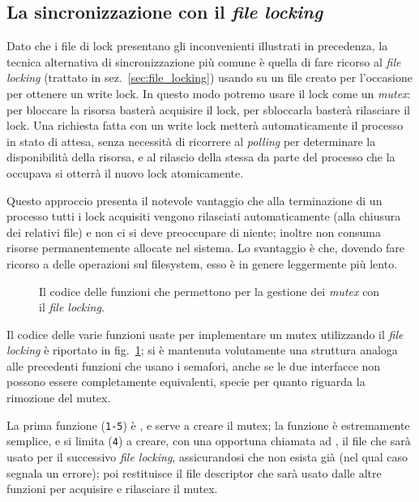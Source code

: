 

\subsection{La sincronizzazione con il \textit{file locking}}
\label{sec:ipc_lock_file}

Dato che i file di lock presentano gli inconvenienti illustrati in precedenza,
la tecnica alternativa di sincronizzazione più comune è quella di fare ricorso
al \textit{file locking} (trattato in sez.~\ref{sec:file_locking}) usando
 su un file creato per l'occasione per ottenere un write lock. In
questo modo potremo usare il lock come un \textit{mutex}: per bloccare la
risorsa basterà acquisire il lock, per sbloccarla basterà rilasciare il
lock. Una richiesta fatta con un write lock metterà automaticamente il
processo in stato di attesa, senza necessità di ricorrere al \textit{polling}
per determinare la disponibilità della risorsa, e al rilascio della stessa da
parte del processo che la occupava si otterrà il nuovo lock atomicamente.

Questo approccio presenta il notevole vantaggio che alla terminazione di un
processo tutti i lock acquisiti vengono rilasciati automaticamente (alla
chiusura dei relativi file) e non ci si deve preoccupare di niente; inoltre
non consuma risorse permanentemente allocate nel sistema. Lo svantaggio è che,
dovendo fare ricorso a delle operazioni sul filesystem, esso è in genere
leggermente più lento.

\begin{figure}[!htbp]
  \footnotesize \centering
  \begin{minipage}[c]{\codesamplewidth}
  \end{minipage} 
  \normalsize 
  \caption{Il codice delle funzioni che permettono per la gestione dei
    \textit{mutex} con il \textit{file locking}.}
  \label{fig:ipc_flock_mutex}
\end{figure}

Il codice delle varie funzioni usate per implementare un mutex utilizzando il
\textit{file locking} è riportato in fig.~\ref{fig:ipc_flock_mutex}; si è
mantenuta volutamente una struttura analoga alle precedenti funzioni che usano
i semafori, anche se le due interfacce non possono essere completamente
equivalenti, specie per quanto riguarda la rimozione del mutex.

La prima funzione (\texttt{\small 1-5}) è , e serve a
creare il mutex; la funzione è estremamente semplice, e si limita
(\texttt{\small 4}) a creare, con una opportuna chiamata ad , il
file che sarà usato per il successivo \textit{file locking}, assicurandosi che
non esista già (nel qual caso segnala un errore); poi restituisce il file
descriptor che sarà usato dalle altre funzioni per acquisire e rilasciare il
mutex.

